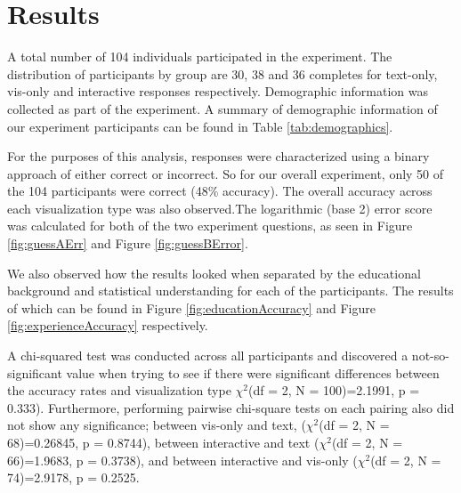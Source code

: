 \section{Results}

\demographicstable

\accuracyPlot

\educationAccuracy

\experienceAccuracy

\guessAError

\guessBError

A total number of 104 individuals participated in the experiment. The
distribution of participants by group are 30, 38 and 36 completes for
text-only, vis-only and interactive responses respectively. Demographic
information was collected as part of the experiment. A summary of demographic
information of our experiment participants can be found in Table \ref{tab:demographics}.

For the purposes of this analysis, responses were characterized using a
binary approach of either correct or incorrect. So for our overall
experiment, only 50 of the 104 participants were correct (48\% accuracy). The
overall accuracy across each visualization type was also observed.The
logarithmic (base 2) error score was calculated for both of the two
experiment questions, as seen in Figure \ref{fig:guessAErr} and Figure \ref{fig:guessBError}.

We also observed how the results looked when separated by the educational
background and statistical understanding for each of the participants. The
results of which can be found in Figure \ref{fig:educationAccuracy} and Figure \ref{fig:experienceAccuracy} respectively.

A chi-squared test was conducted across all participants and discovered a
not-so-significant value when trying to see if there were significant
differences between the accuracy rates and visualization type $\chi^2$(df = 2, N = 100)=2.1991, p = 0.333). Furthermore,
performing pairwise chi-square tests on each pairing also did not show any
significance; between vis-only and text, ($\chi^2$(df = 2, N = 68)=0.26845, p =
0.8744), between interactive and text ($\chi^2$(df = 2, N = 66)=1.9683, p =
0.3738), and between interactive and vis-only ($\chi^2$(df = 2, N = 74)=2.9178,
p = 0.2525.



